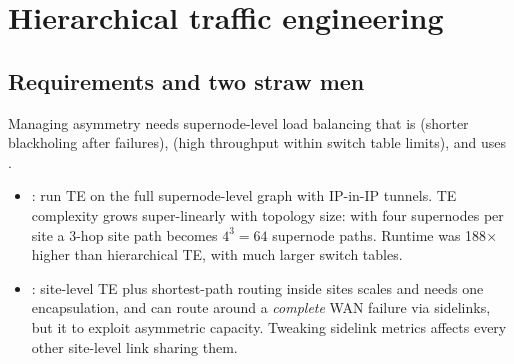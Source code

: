 \section{Hierarchical traffic engineering}
\subsection{Requirements and two straw men}
Managing asymmetry needs supernode-level load balancing that is  (shorter blackholing after failures),  (high throughput within switch table limits), and uses .
\begin{itemize}
\item {}: run TE on the full supernode-level graph with IP-in-IP tunnels. TE complexity grows super-linearly with topology size: with four supernodes per site a 3-hop site path becomes $4^3=64$ supernode paths. Runtime was 188$\times$ higher than hierarchical TE, with much larger switch tables.
\item {}: site-level TE plus shortest-path routing inside sites scales and needs one encapsulation, and can route around a \emph{complete} WAN failure via sidelinks, but it  to exploit asymmetric capacity. Tweaking sidelink metrics affects every other site-level link sharing them.
\end{itemize}

